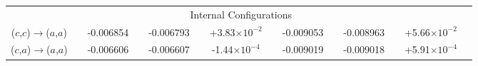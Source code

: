 \documentclass[aip,jcp,amsmath]{revtex4-1}
\begin{document}
{\begin{figure}
\begin{longtable}[!ht]{cccccccccccccc}
                                                                  && \multicolumn{10}{c}{Internal Configurations} \\
($c$,$c$)$\rightarrow$($a$,$a$)                                   && -0.006854 && -0.006793 && +3.83$\times 10^{-2}$ && -0.009053 && -0.008963 && +5.66$\times 10^{-2}$  \\ %
($c$,$a$)$\rightarrow$($a$,$a$)                                   && -0.006606 && -0.006607 && -1.44$\times 10^{-4}$ && -0.009019 && -0.009018 && +5.91$\times 10^{-4}$  \\ %

\hline
\hline
\end{longtable}
\end{figure}  

}

\clearpage
\end{document}
